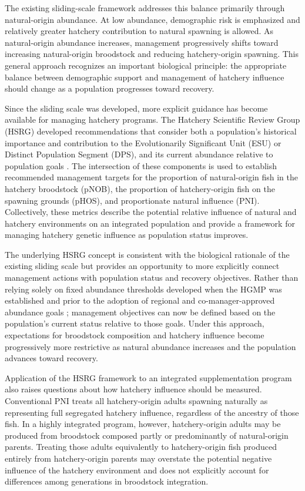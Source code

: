 \documentclass[12pt,letterpaper]{article}
\begin{document}
The existing sliding-scale framework addresses this balance primarily through natural-origin abundance. At low abundance, demographic risk is emphasized and relatively greater hatchery contribution to natural spawning is allowed. As natural-origin abundance increases, management progressively shifts toward increasing natural-origin broodstock and reducing hatchery-origin spawning. This general approach recognizes an important biological principle: the appropriate balance between demographic support and management of hatchery influence should change as a population progresses toward recovery.

Since the sliding scale was developed, more explicit guidance has become available for managing hatchery programs. The Hatchery Scientific Review Group (HSRG) developed recommendations that consider both a population's historical importance and contribution to the Evolutionarily Significant Unit (ESU) or Distinct Population Segment (DPS), and its current abundance relative to population goals \autocite{hsrg_implementation_2017}. The intersection of these components is used to establish recommended management targets for the proportion of natural-origin fish in the hatchery broodstock (pNOB), the proportion of hatchery-origin fish on the spawning grounds (pHOS), and proportionate natural influence (PNI). Collectively, these metrics describe the potential relative influence of natural and hatchery environments on an integrated population and provide a framework for managing hatchery genetic influence as population status improves.

The underlying HSRG concept is consistent with the biological rationale of the existing sliding scale but provides an opportunity to more explicitly connect management actions with population status and recovery objectives. Rather than relying solely on fixed abundance thresholds developed when the HGMP was established and prior to the adoption of regional and co-manager-approved abundance goals \autocite{cbp_vision_2020}; management objectives can now be defined based on the population's current status relative to those goals. Under this approach, expectations for broodstock composition and hatchery influence become progressively more restrictive as natural abundance increases and the population advances toward recovery.

Application of the HSRG framework to an integrated supplementation program also raises questions about how hatchery influence should be measured. Conventional PNI treats all hatchery-origin adults spawning naturally as representing full segregated hatchery influence, regardless of the ancestry of those fish. In a highly integrated program, however, hatchery-origin adults may be produced from broodstock composed partly or predominantly of natural-origin parents. Treating those adults equivalently to hatchery-origin fish produced entirely from hatchery-origin parents may overstate the potential negative influence of the hatchery environment and does not explicitly account for differences among generations in broodstock integration.
\end{document}
